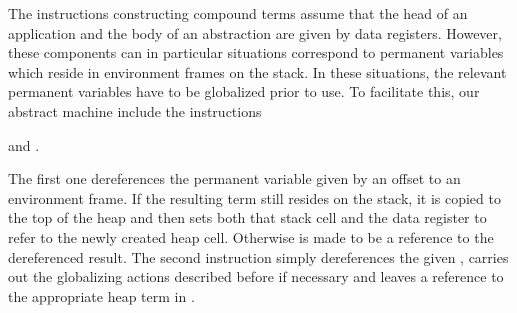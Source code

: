 The instructions constructing compound terms assume that the head of an
application and the body of an abstraction are given by data registers.
However, these components can in particular situations correspond to
permanent variables which reside in environment frames
on the stack. In these situations, the relevant permanent variables have to be
globalized prior to use. To facilitate this,
our abstract machine include the instructions
\begin{tabbing}
 \dquad and .
\end{tabbing}
The first one dereferences the permanent variable  given by an
offset to an environment frame. If the resulting term still resides on the
stack, it is copied to the top of the heap and then sets both that
stack cell and the data register  to refer to the newly created
heap cell. Otherwise  is made to be a reference to the
dereferenced result.
The second instruction simply dereferences the given
, carries out the globalizing actions described before if necessary and
leaves a reference to the appropriate heap term in .

